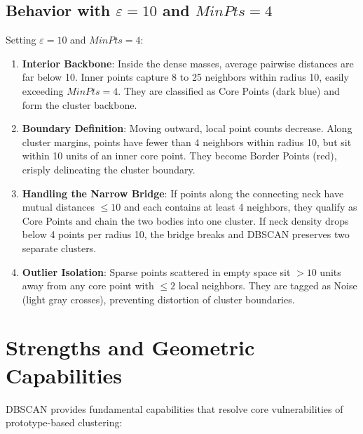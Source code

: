 \subsection{Behavior with \texorpdfstring{$\varepsilon = 10$ and $MinPts = 4$}{Eps = 10 and MinPts = 4}}

Setting $\varepsilon = 10$ and $MinPts = 4$:
\begin{enumerate}
    \item \textbf{Interior Backbone}: Inside the dense masses, average pairwise distances are far below 10. Inner points capture 8 to 25 neighbors within radius 10, easily exceeding $MinPts = 4$. They are classified as Core Points (dark blue) and form the cluster backbone.
    \item \textbf{Boundary Definition}: Moving outward, local point counts decrease. Along cluster margins, points have fewer than 4 neighbors within radius 10, but sit within 10 units of an inner core point. They become Border Points (red), crisply delineating the cluster boundary.
    \item \textbf{Handling the Narrow Bridge}: If points along the connecting neck have mutual distances $\le 10$ and each contains at least 4 neighbors, they qualify as Core Points and chain the two bodies into one cluster. If neck density drops below 4 points per radius 10, the bridge breaks and DBSCAN preserves two separate clusters.
    \item \textbf{Outlier Isolation}: Sparse points scattered in empty space sit $> 10$ units away from any core point with $\le 2$ local neighbors. They are tagged as Noise (light gray crosses), preventing distortion of cluster boundaries.
\end{enumerate}

\section{Strengths and Geometric Capabilities}
\label{sec:dm-dbscan-strengths}

DBSCAN provides fundamental capabilities that resolve core vulnerabilities of prototype-based clustering:

